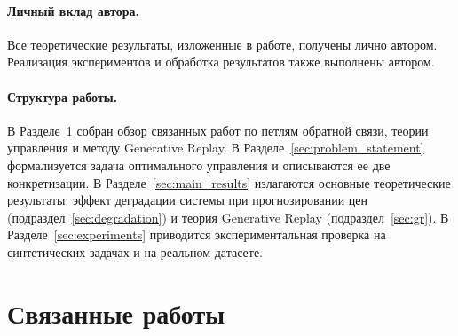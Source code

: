 \documentclass[a4paper,14pt,oneside,openany]{extarticle}
\begin{document}

\paragraph{Личный вклад автора.}
Все теоретические результаты, изложенные в работе, получены лично автором. Реализация экспериментов и обработка результатов также выполнены автором.

\paragraph{Структура работы.}
В Разделе~\ref{sec:related_work} собран обзор связанных работ по петлям обратной связи, теории управления и методу Generative Replay. В Разделе~\ref{sec:problem_statement} формализуется задача оптимального управления и описываются ее две конкретизации. В Разделе~\ref{sec:main_results} излагаются основные теоретические результаты: эффект деградации системы при прогнозировании цен (подраздел~\ref{sec:degradation}) и теория Generative Replay (подраздел~\ref{sec:gr}). В Разделе~\ref{sec:experiments} приводится экспериментальная проверка на синтетических задачах и на реальном датасете.

\newpage
\section{Связанные работы}\label{sec:related_work}
\end{document}
